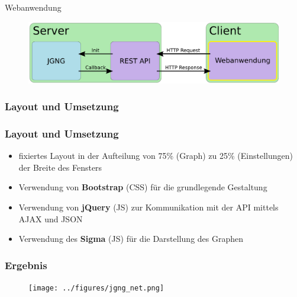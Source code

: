 \begin{frame}
    \begin{center}
        \Huge{Webanwendung}
    \end{center}
    \begin{figure}[h]
        \centering
        \includegraphics[width=\textwidth]{bilder/client-server_web-active.pdf}
    \end{figure}
\end{frame}
\subsubsection*{Layout und Umsetzung}
\begin{frame}
    \frametitle{Layout und Umsetzung}
    \begin{itemize}
        \item fixiertes Layout in der Aufteilung von 75\% (Graph) zu 25\% (Einstellungen) der Breite des Fensters
        \item Verwendung von \textbf{Bootstrap} (CSS) für die grundlegende Gestaltung
        \item Verwendung von \textbf{jQuery} (JS) zur Kommunikation mit der API mittels AJAX und JSON
        \item Verwendung des \textbf{Sigma} (JS) für die Darstellung des Graphen
    \end{itemize}
\end{frame}
\begin{frame}
    \frametitle{Ergebnis}
    \begin{figure}[h]
        \centering
        \texttt{[image: ../figures/jgng\_net.png]}
    \end{figure}
\end{frame}
